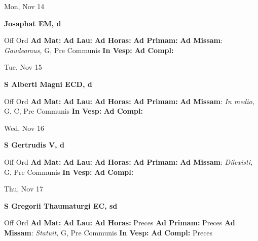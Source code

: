 \documentclass[10pt]{article}
\begin{document}
\begin{minipage}{3.5in}
\vspace{2em}\begin{center}
Mon, Nov 14
\end{center}\textbf{ \large Josaphat EM, \textnormal{\normalsize d}}
\begin{justify}
Off Ord
\textbf{Ad Mat: }
\textbf{Ad Lau: }
\textbf{Ad Horas: }
\textbf{Ad Primam: }
\textbf{Ad Missam}: \textit{Gaudeamus,} G, Pre Communis
\textbf{In Vesp: }
\textbf{Ad Compl: }\end{justify}
\end{minipage}



\begin{minipage}{3.5in}
\vspace{2em}\begin{center}
Tue, Nov 15
\end{center}\textbf{ \large S Alberti Magni ECD, \textnormal{\normalsize d}}
\begin{justify}
Off Ord
\textbf{Ad Mat: }
\textbf{Ad Lau: }
\textbf{Ad Horas: }
\textbf{Ad Primam: }
\textbf{Ad Missam}: \textit{In medio,} G, C, Pre Communis
\textbf{In Vesp: }
\textbf{Ad Compl: }\end{justify}
\end{minipage}



\begin{minipage}{3.5in}
\vspace{2em}\begin{center}
Wed, Nov 16
\end{center}\textbf{ \large S Gertrudis V, \textnormal{\normalsize d}}
\begin{justify}
Off Ord
\textbf{Ad Mat: }
\textbf{Ad Lau: }
\textbf{Ad Horas: }
\textbf{Ad Primam: }
\textbf{Ad Missam}: \textit{Dilexisti,} G, Pre Communis
\textbf{In Vesp: }
\textbf{Ad Compl: }\end{justify}
\end{minipage}



\begin{minipage}{3.5in}
\vspace{2em}\begin{center}
Thu, Nov 17
\end{center}\textbf{ \large S Gregorii Thaumaturgi EC, \textnormal{\normalsize sd}}
\begin{justify}
Off Ord
\textbf{Ad Mat: }
\textbf{Ad Lau: }
\textbf{Ad Horas: }Preces
\textbf{Ad Primam: }Preces
\textbf{Ad Missam}: \textit{Statuit,} G, Pre Communis
\textbf{In Vesp: }
\textbf{Ad Compl: }Preces\end{justify}
\end{minipage}
\end{document}
